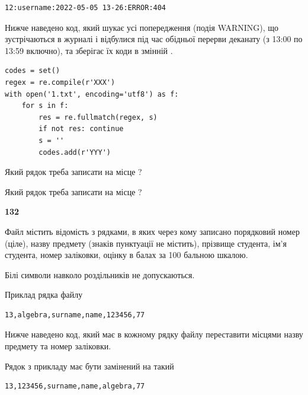 \begin{verbatim}
12:username:2022-05-05 13-26:ERROR:404
\end{verbatim}


Нижче наведено код, який шукає усі попередження (подія WARNING), що зустрі\-ча\-ються в журналі і відбулися під час обідньої перерви деканату (з 13:00 по 13:59 включно), та зберігає їх коди в змінній .



\begin{verbatim}
codes = set()
regex = re.compile(r'XXX')
with open('1.txt', encoding='utf8') as f:
    for s in f:
        res = re.fullmatch(regex, s)
        if not res: continue
        s = ''
        codes.add(r'YYY')
\end{verbatim}







Який рядок треба записати на місце  ?\par
\vspace{5mm}


Який рядок треба записати на місце  ?\par


\newpage

{\begin {center}\textbf{ 132}\end {center}}\par
Файл  містить відомість з рядками, в яких через кому записано поряд\-ковий номер (ціле), назву предмету (знаків пунктуації не містить), прізвище студента, ім'я студента, номер заліковки, оцінку в балах за 100 бальною шкалою.

Білі символи навколо роздільників не допускаються.

Приклад рядка файлу



\begin{verbatim}
13,algebra,surname,name,123456,77
\end{verbatim}


Нижче наведено код, який має в кожному рядку файлу переставити місцями назву предмету та номер заліковки.

Рядок з прикладу має бути замінений на такий



\begin{verbatim}
13,123456,surname,name,algebra,77
\end{verbatim}




